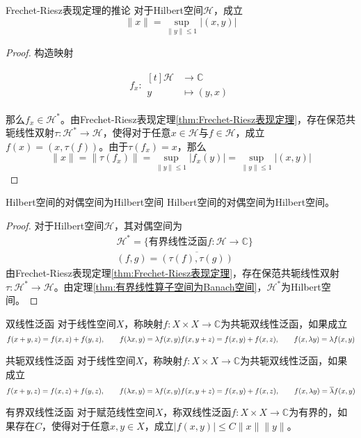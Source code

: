 \documentclass[lang = cn, scheme = chinese, thmcnt = section]{elegantbook}
\newcommand{\C}{\mathbb{C}}  		   %
\newcommand{\function}[5]{
	\begin{align*}
		#1:\begin{aligned}[t]
			#2 &\longrightarrow #3\\
			#4 &\longmapsto #5
		\end{aligned}
	\end{align*}
}                                     %
\begin{document}
\begin{corollary}{}{Frechet-Riesz表现定理的推论}
	对于Hilbert空间$\mathcal{H}$，成立
	$$
	\|x\|=\sup_{\|y\|\le 1}|(x,y)|
	$$
\end{corollary}

\begin{proof}
	构造映射
	\function{f_x}{\mathcal{H}}{\C}{y}{(y,x)}
	那么$f_x\in\mathcal{H}^*$。由Frechet-Riesz表现定理\ref{thm:Frechet-Riesz表现定理}，存在保范共轭线性双射$\tau:\mathcal{H}^*\to \mathcal{H}$，使得对于任意$x\in \mathcal{H}$与$f\in \mathcal{H}$，成立$f(x)=(x,\tau(f))$。由于$\tau(f_x)=x$，那么
	$$
	\|x\|
	=\|\tau(f_x)\|
	=\sup_{\|y\|\le 1}|f_x(y)|
	=\sup_{\|y\|\le 1}|(x,y)|
	$$ 
\end{proof}

\begin{theorem}{}{Hilbert空间的对偶空间为Hilbert空间}
	Hilbert空间的对偶空间为Hilbert空间。
\end{theorem}

\begin{proof}
	对于Hilbert空间$\mathcal{H}$，其对偶空间为
	\begin{align*}
		&\mathcal{H}^*=\{ \text{有界线性泛函}f:\mathcal{H}\to \C \}\\
		& (f,g)=\overline{(\tau(f),\tau(g))}
	\end{align*}
	由Frechet-Riesz表现定理\ref{thm:Frechet-Riesz表现定理}，存在保范共轭线性双射$\tau:\mathcal{H}^*\to\mathcal{H}$。由定理\ref{thm:有界线性算子空间为Banach空间}，$\mathcal{H}^*$为Hilbert空间。
\end{proof}

\begin{definition}{双线性泛函}
	对于线性空间$X$，称映射$f:X\times X\to\C$为共轭双线性泛函，如果成立
	$$
	f(x+y,z)=f(x,z)+f(y,z),\qquad f(\lambda x,y)=\lambda f(x,y)\\
	f(x,y+z)=f(x,y)+f(x,z),\qquad f(x,\lambda y)=\lambda f(x,y)
	$$
\end{definition}

\begin{definition}{共轭双线性泛函}
	对于线性空间$X$，称映射$f:X\times X\to\C$为共轭双线性泛函，如果成立
	$$
	f(x+y,z)=f(x,z)+f(y,z),\qquad f(\lambda x,y)=\lambda f(x,y)\\
	f(x,y+z)=f(x,y)+f(x,z),\qquad f(x,\lambda y)=\overline{\lambda }f(x,y)
	$$
\end{definition}

\begin{definition}{有界双线性泛函}
	对于赋范线性空间$X$，称双线性泛函$f:X\times X\to\C$为有界的，如果存在$C$，使得对于任意$x,y\in X$，成立$|f(x,y)|\le C\|x\|\|y\|$。
\end{definition}
\end{document}
